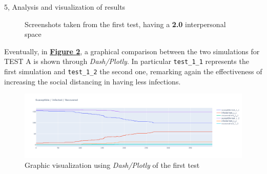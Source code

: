 \documentclass[10pt,a4paper]{article}
\begin{document}
\begin{task}{5, Analysis and visualization of results}
\begin{figure}[H]
    \centering
    \hfill
    \hfill
    \caption{Screenshots taken from the first test, having a \textbf{2.0} interpersonal space}
    \label{fig:5.3-1.2}
\end{figure}

Eventually, in \textbf{\hyperref[fig:first-test-dash]{Figure \ref{fig:first-test-dash}}}, a graphical comparison between the two simulations for TEST A is shown through \textit{Dash/Plotly}. In particular \texttt{test\_1\_1} represents the first simulation and \texttt{test\_1\_2} the second one, remarking again the effectiveness of increasing the social distancing in having less infections.

\begin{figure}[H]
    \centering
    \includegraphics[scale=0.3]{images/5.3/first_test_dash.png}
    \caption{Graphic visualization using \textit{Dash/Plotly} of the first test}
    \label{fig:first-test-dash}
\end{figure}


\end{task}
\end{document}
